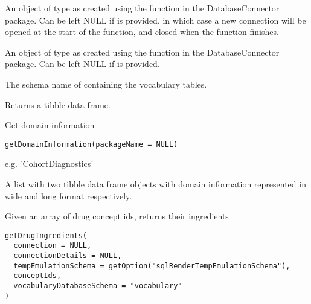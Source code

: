 \documentclass[a4paper]{book}
\begin{document}
\begin{Arguments}
\begin{ldescription}
\item[\code{connection}] An object of type  as created using the
 function in the
DatabaseConnector package. Can be left NULL if 
is provided, in which case a new connection will be opened at the start
of the function, and closed when the function finishes.

\item[\code{connectionDetails}] An object of type  as created using the
 function in the
DatabaseConnector package. Can be left NULL if  is
provided.

\item[\code{vocabularyDatabaseSchema}] The schema name of containing the vocabulary tables.
\end{ldescription}
\end{Arguments}
%
\begin{Value}
Returns a tibble data frame.
\end{Value}
%
\begin{Description}\relax
Get domain information
\end{Description}
%
\begin{Usage}
\begin{verbatim}
getDomainInformation(packageName = NULL)
\end{verbatim}
\end{Usage}
%
\begin{Arguments}
\begin{ldescription}
\item[\code{packageName}] e.g. 'CohortDiagnostics'
\end{ldescription}
\end{Arguments}
%
\begin{Value}
A list with two tibble data frame objects with domain information represented in wide and long format respectively.
\end{Value}
%
\begin{Description}\relax
Given an array of drug concept ids, returns their ingredients
\end{Description}
%
\begin{Usage}
\begin{verbatim}
getDrugIngredients(
  connection = NULL,
  connectionDetails = NULL,
  tempEmulationSchema = getOption("sqlRenderTempEmulationSchema"),
  conceptIds,
  vocabularyDatabaseSchema = "vocabulary"
)
\end{verbatim}
\end{Usage}
\end{document}
